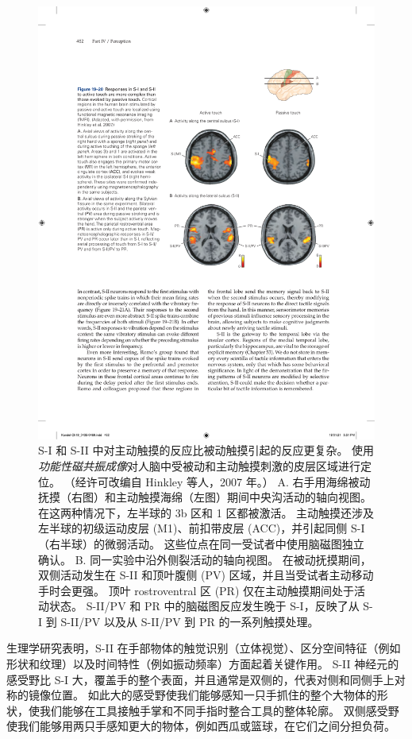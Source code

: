\begin{figure}[htbp]
	\centering
	\includegraphics[width=1.0\linewidth]{chap19/fig_19_20}
	\caption{S-I 和 S-II 中对主动触摸的反应比被动触摸引起的反应更复杂。
		使用\textit{功能性磁共振成像}对人脑中受被动和主动触摸刺激的皮层区域进行定位。 （经许可改编自 Hinkley 等人，2007 年。）
		A. 右手用海绵被动抚摸（右图）和主动触摸海绵（左图）期间中央沟活动的轴向视图。 在这两种情况下，左半球的 3b 区和 1 区都被激活。
		主动触摸还涉及左半球的初级运动皮层 (M1)、前扣带皮层 (ACC)，并引起同侧 S-I（右半球）的微弱活动。
		这些位点在同一受试者中使用脑磁图独立确认。
		B. 同一实验中沿外侧裂活动的轴向视图。
		在被动抚摸期间，双侧活动发生在 S-II 和顶叶腹侧 (PV) 区域，并且当受试者主动移动手时会更强。
		顶叶 rostroventral 区 (PR) 仅在主动触摸期间处于活动状态。
		S-II/PV 和 PR 中的脑磁图反应发生晚于 S-I，反映了从 S-I 到 S-II/PV 以及从 S-II/PV 到 PR 的一系列触摸处理。}
	\label{fig:19_20}
\end{figure}


生理学研究表明，S-II 在手部物体的触觉识别（立体视觉）、区分空间特征（例如形状和纹理）以及时间特性（例如振动频率）方面起着关键作用。
S-II 神经元的感受野比 S-I 大，覆盖手的整个表面，并且通常是双侧的，代表对侧和同侧手上对称的镜像位置。
如此大的感受野使我们能够感知一只手抓住的整个大物体的形状，使我们能够在工具接触手掌和不同手指时整合工具的整体轮廓。
双侧感受野使我们能够用两只手感知更大的物体，例如西瓜或篮球，在它们之间分担负荷。


